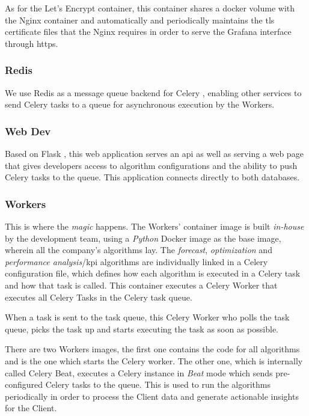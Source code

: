 As for the Let's Encrypt container, this container shares a docker volume with the Nginx container and automatically and periodically maintains the \gls{tls} certificate files that the Nginx requires in order to serve the Grafana interface through \gls{https}. 


\subsubsection{Redis}\label{methodology:sss:redis}

We use Redis \parencite{redis_2022} as a message queue backend for Celery \parencite{celery}, enabling other services to send Celery tasks to a queue for asynchronous execution by the Workers.

\subsubsection{Web Dev}\label{methodology:sss:webdev}

Based on Flask \parencite{pallets_2022}, this web application serves an \gls{api} as well as serving a web page that gives developers access to algorithm configurations and the ability to push Celery tasks to the queue. This application connects directly to both databases.

\subsubsection{Workers}\label{methodology:sss:workers}

This is where the \textit{magic} happens. The Workers' container image is built \textit{in-house} by the development team, using a \textit{Python} Docker image as the base image, wherein all the company's algorithms lay. The \textit{forecast}, \textit{optimization} and \textit{performance analysis}/\gls{kpi} algorithms are individually linked in a Celery configuration file, which defines how each algorithm is executed in a Celery task and how that task is called. This container executes a Celery Worker that executes all Celery Tasks in the Celery task queue.

When a task is sent to the task queue, this Celery Worker who polls the task queue, picks the task up and starts executing the task as soon as possible.

There are two Workers images, the first one contains the code for all algorithms and is the one which starts the Celery worker. The other one, which is internally called Celery Beat, executes a Celery instance in \textit{Beat} mode which sends pre-configured Celery tasks to the queue. This is used to run the algorithms periodically in order to process the Client data and generate actionable insights for the Client.

